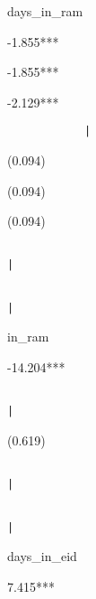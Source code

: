 \documentclass[]{article}
\begin{document}
\textbar{}

days\_in\_ram

-1.855***

-1.855***

-2.129***

\begin{verbatim}
            |
\end{verbatim}

\textbar{}

(0.094)

(0.094)

(0.094)

\begin{verbatim}
                                                                                                                                   |
\end{verbatim}

\textbar{}

\begin{verbatim}
                                                                                                                                                        |
\end{verbatim}

\textbar{}

in\_ram

-14.204***

\begin{verbatim}
                                                                                                                             |
\end{verbatim}

\textbar{}

(0.619)

\begin{verbatim}
                                                                                                                                                 |
\end{verbatim}

\textbar{}

\begin{verbatim}
                                                                                                                                                        |
\end{verbatim}

\textbar{}

days\_in\_eid

7.415***
\end{document}
